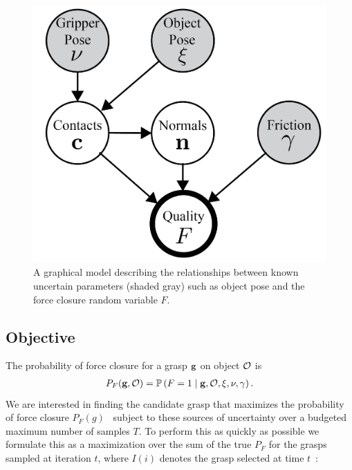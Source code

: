 \begin{figure}[t!]
\centering
\includegraphics[scale=0.5]{figures/illustrations/dexnet_graphical_model_simple.png}
\caption{A graphical model describing the relationships between known uncertain parameters (shaded gray) such as object pose and the force closure random variable $F$.}
\vspace*{-15pt}
\end{figure}

\subsection{Objective}
The probability of force closure for a grasp $\mathbf{g}$ on object $\mathcal{O}$ is
\begin{align*}
	P_F(\mathbf{g}, \mathcal{O}) = \mathbb{P}\left(F = 1 \mid \mathbf{g}, \mathcal{O}, \xi, \nu, \gamma \right).
\end{align*}
\noindent We are interested in finding the candidate grasp that maximizes the probability of force closure $P_F(g)$~\cite{kim2012physically, laskey2015bandits, mahler2015gp, weisz2012pose} subject to these sources of uncertainty over a budgeted maximum number of samples $T$.
To perform this as quickly as possible we formulate this as a maximization over the sum of the true $P_F$ for the grasps sampled at iteration $t$, where $I(i)$ denotes the grasp selected at time $t$~\cite{laskey2015bandits}:

